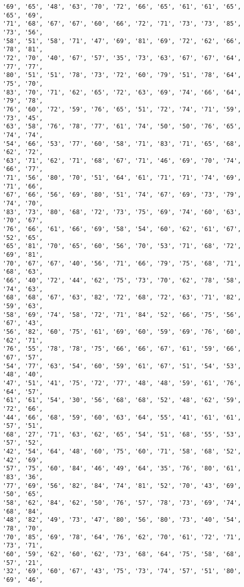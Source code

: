 \documentclass[11pt]{article}
\begin{document}
\begin{Verbatim}[commandchars=\\\{\}]
'69', '65', '48', '63', '70', '72', '66', '65', '61', '61', '65', '65', '69',
'71', '68', '67', '67', '60', '66', '72', '71', '73', '73', '85', '73', '56',
'58', '51', '58', '71', '47', '69', '81', '69', '72', '62', '66', '78', '81',
'72', '70', '40', '67', '57', '35', '73', '63', '67', '67', '64', '77', '77',
'80', '51', '51', '78', '73', '72', '60', '79', '51', '78', '64', '75', '70',
'83', '70', '71', '62', '65', '72', '63', '69', '74', '66', '64', '79', '78',
'76', '60', '72', '59', '76', '65', '51', '72', '74', '71', '59', '73', '45',
'63', '58', '76', '78', '77', '61', '74', '50', '50', '76', '65', '74', '74',
'54', '66', '53', '77', '60', '58', '71', '83', '71', '65', '68', '62', '72',
'63', '71', '62', '71', '68', '67', '71', '46', '69', '70', '74', '66', '77',
'71', '56', '80', '70', '51', '64', '61', '71', '71', '74', '69', '71', '66',
'67', '66', '56', '69', '80', '51', '74', '67', '69', '73', '79', '74', '70',
'83', '73', '80', '68', '72', '73', '75', '69', '74', '60', '63', '70', '67',
'76', '66', '61', '66', '69', '58', '54', '60', '62', '61', '67', '52', '65',
'65', '81', '70', '65', '60', '56', '70', '53', '71', '68', '72', '69', '81',
'70', '67', '67', '40', '56', '71', '66', '79', '75', '68', '71', '68', '63',
'66', '40', '72', '44', '62', '75', '73', '70', '62', '78', '58', '74', '63',
'68', '68', '67', '63', '82', '72', '68', '72', '63', '71', '82', '59', '63',
'58', '69', '74', '58', '72', '71', '84', '52', '66', '75', '56', '67', '43',
'56', '82', '60', '75', '61', '69', '60', '59', '69', '76', '60', '62', '71',
'76', '55', '78', '78', '75', '66', '66', '67', '61', '59', '66', '67', '57',
'54', '77', '63', '54', '60', '59', '61', '67', '51', '54', '53', '48', '40',
'47', '51', '41', '75', '72', '77', '48', '48', '59', '61', '76', '64', '57',
'61', '61', '54', '30', '56', '68', '68', '52', '48', '62', '59', '72', '66',
'44', '66', '68', '59', '60', '63', '64', '55', '41', '61', '61', '57', '51',
'68', '27', '71', '63', '62', '65', '54', '51', '68', '55', '53', '57', '52',
'42', '54', '64', '48', '60', '75', '60', '71', '58', '68', '52', '42', '69',
'57', '75', '60', '84', '46', '49', '64', '35', '76', '80', '61', '83', '36',
'77', '69', '56', '82', '84', '74', '81', '52', '70', '43', '69', '50', '65',
'58', '62', '84', '62', '50', '76', '57', '78', '73', '69', '74', '68', '84',
'48', '82', '49', '73', '47', '80', '56', '80', '73', '40', '54', '78', '70',
'70', '85', '69', '78', '64', '76', '62', '70', '61', '72', '71', '73', '71',
'60', '59', '62', '60', '62', '73', '68', '64', '75', '58', '68', '57', '21',
'32', '69', '60', '67', '43', '75', '73', '74', '57', '51', '80', '69', '46',

\end{Verbatim}
\end{document}
